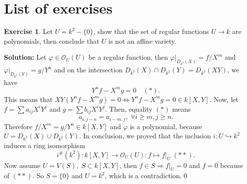 \chapter{List of exercises}

\begin{dang}
\textbf{Exercise 1}. Let $U=k^2-\{0\}$, show that the set of regular functions $U\to k$ are polynomials, then 
conclude that $U$ is not an affine variety.    
\end{dang}
\textbf{Solution:} Let $\varphi\in\mathcal{O}_U(U)$ be a regular function, then 
$\varphi|_{D_{k^2}(X)}=f/X^m$ and $\varphi|_{D_{k^2}(Y)}=g/Y^n$ and on the intersection $D_{k^2}(X)\cap D_{k^2}(Y)=D_{k^2}(XY)$, we have 
\begin{equation}
    Y^nf - X^mg = 0\quad(*).
\end{equation}
This means that $XY(Y^n f - X^mg) = 0\iff Y^n f - X^m g=0\in k[X,Y]$. Now, let $f=\sum a_{ij}X^iY^j$ and 
$g=\sum b_{ij} X^iY^j$. Then, equality $(*)$ means 
\begin{equation}
    a_{i, j-n} = a_{i-m,j},\;\forall i\geq m, j\geq n.
\end{equation}  
Therefore $f/X^m = g/Y^n\in k[X,Y]$ and $\varphi$ is a polynomial, because $U=D_{k^2}(X)\cup D_{k^2}(Y)$. In conclusion,
we proved that the inclusion $i:U\hookrightarrow k^2$ induces a ring isomorphism
\begin{equation}
    i^\#(k^2): k[X,Y]\to \mathcal{O}_U(U):f\mapsto f|_U\; (**).
\end{equation}
Now assume $U=V(S),\;S\subset k[X,Y]$, then $f\in S\Rightarrow f|_U=0$ and $f=0$ because of $(**)$. So 
$S=\{0\}$ and $U=k^2$, which is a contradiction.\qed


